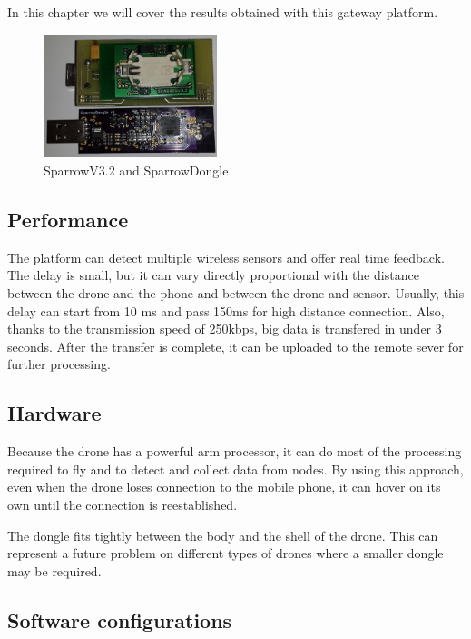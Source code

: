 \label{chap:results}

In this chapter we will cover the results obtained with this gateway platform.

\begin{figure}[ht] \centering
\includegraphics[width=0.45\textwidth]{img/sparrow.jpg} \caption{SparrowV3.2 and SparrowDongle} \end{figure}

 
\subsection{Performance}

The platform can detect multiple wireless sensors and offer real time feedback. 
The delay is small, but it can vary directly proportional with the distance 
between the drone and the phone and between the drone and sensor. Usually, this 
delay can start from 10 ms and pass 150ms for high distance connection. Also,
thanks to the transmission speed of 250kbps, big data is transfered in under 3 
seconds. After the transfer is complete, it can be uploaded to the remote sever 
for further processing.
 

\subsection{Hardware}

Because the drone has a powerful arm processor, it can do most of the processing 
required to fly and to detect and collect data from nodes. By using this approach,
even when the drone loses connection to the mobile phone, it can hover on its own 
until the connection is reestablished.

The dongle fits tightly between the body and the shell of the drone. This can 
represent a future problem on different types of drones where a smaller dongle 
may be required. 

\subsection{Software configurations}

